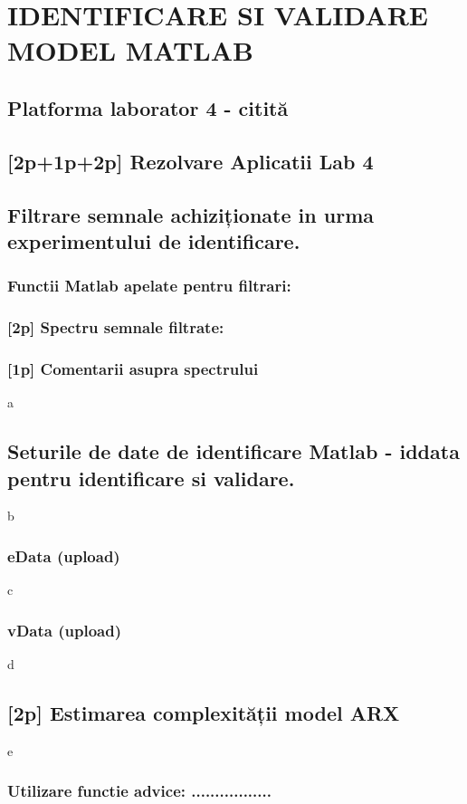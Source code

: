 \documentclass[12pt,english]{article}
\begin{document}
\section { IDENTIFICARE SI VALIDARE MODEL MATLAB }
\subsection { Platforma laborator 4 - citită                                  }
\subsection { [2p+1p+2p] Rezolvare Aplicatii Lab 4 }
\subsection { Filtrare semnale achiziționate in urma experimentului de identificare. }
\subsubsection { Functii Matlab apelate pentru filtrari: }
\subsubsection { [2p] Spectru semnale filtrate: }
\subsubsection { [1p] Comentarii asupra spectrului }
a
\subsection { Seturile de date de identificare Matlab - iddata pentru identificare si validare. }
b
\subsubsection { eData  (upload) }
c
\subsubsection { vData  (upload) }
d
\subsection { [2p] Estimarea complexității model ARX }
e
\subsubsection { Utilizare functie advice: ................. }
\end{document}
